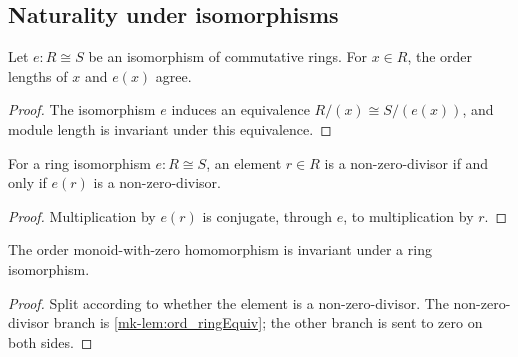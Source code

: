 \subsection{Naturality under isomorphisms}
\label{mk-subsec:ordFrac_ringEquiv}

\begin{lemma}
  \label{mk-lem:ord_ringEquiv}
  \leanok

  Let \(e\colon R\cong S\) be an isomorphism of commutative rings.  For
  \(x\in R\), the order lengths of \(x\) and \(e(x)\) agree.
\end{lemma}
\begin{proof}
  \leanok
  The isomorphism \(e\) induces an equivalence
  \(R/(x)\cong S/(e(x))\), and module length is invariant under this
  equivalence.
\end{proof}

\begin{lemma}
  \label{mk-lem:nonZeroDivisors_ringEquiv}
  \leanok

  For a ring isomorphism \(e\colon R\cong S\), an element \(r\in R\) is a
  non-zero-divisor if and only if \(e(r)\) is a non-zero-divisor.
\end{lemma}
\begin{proof}
  \leanok
  Multiplication by \(e(r)\) is conjugate, through \(e\), to multiplication
  by \(r\).
\end{proof}

\begin{lemma}
  \label{mk-lem:ordMonoidWithZeroHom_ringEquiv}
  \leanok


  The order monoid-with-zero homomorphism is invariant under a ring
  isomorphism.
\end{lemma}
\begin{proof}
  \leanok
  Split according to whether the element is a non-zero-divisor.  The
  non-zero-divisor branch is \ref{mk-lem:ord_ringEquiv}; the other branch is
  sent to zero on both sides.
\end{proof}

